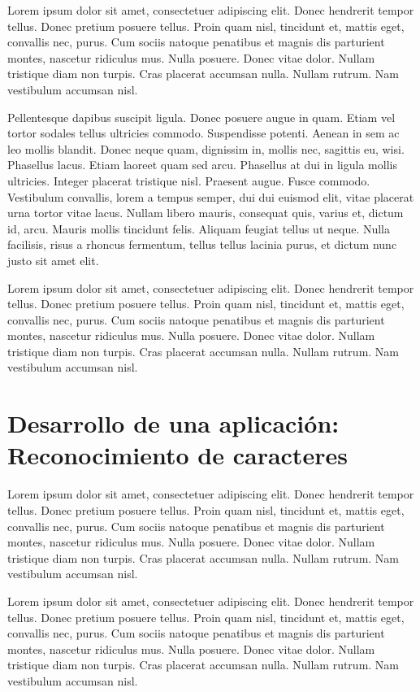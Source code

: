 Lorem ipsum dolor sit amet, consectetuer adipiscing elit.  Donec
hendrerit tempor tellus.  Donec pretium posuere tellus.  Proin quam
nisl, tincidunt et, mattis eget, convallis nec, purus.  Cum sociis
natoque penatibus et magnis dis parturient montes, nascetur ridiculus
mus.  Nulla posuere.  Donec vitae dolor.  Nullam tristique diam non
turpis.  Cras placerat accumsan nulla.  Nullam rutrum.  Nam vestibulum
accumsan nisl.

Pellentesque dapibus suscipit ligula.  Donec posuere augue in quam.
Etiam vel tortor sodales tellus ultricies commodo.  Suspendisse
potenti.  Aenean in sem ac leo mollis blandit.  Donec neque quam,
dignissim in, mollis nec, sagittis eu, wisi.  Phasellus lacus.  Etiam
laoreet quam sed arcu.  Phasellus at dui in ligula mollis ultricies.
Integer placerat tristique nisl.  Praesent augue.  Fusce commodo.
Vestibulum convallis, lorem a tempus semper, dui dui euismod elit,
vitae placerat urna tortor vitae lacus.  Nullam libero mauris,
consequat quis, varius et, dictum id, arcu.  Mauris mollis tincidunt
felis.  Aliquam feugiat tellus ut neque.  Nulla facilisis, risus a
rhoncus fermentum, tellus tellus lacinia purus, et dictum nunc justo
sit amet elit.


Lorem ipsum dolor sit amet, consectetuer adipiscing elit.  Donec
hendrerit tempor tellus.  Donec pretium posuere tellus.  Proin quam
nisl, tincidunt et, mattis eget, convallis nec, purus.  Cum sociis
natoque penatibus et magnis dis parturient montes, nascetur ridiculus
mus.  Nulla posuere.  Donec vitae dolor.  Nullam tristique diam non
turpis.  Cras placerat accumsan nulla.  Nullam rutrum.  Nam vestibulum
accumsan nisl.

\section{Desarrollo de una aplicación: Reconocimiento de caracteres}

Lorem ipsum dolor sit amet, consectetuer adipiscing elit.  Donec
hendrerit tempor tellus.  Donec pretium posuere tellus.  Proin quam
nisl, tincidunt et, mattis eget, convallis nec, purus.  Cum sociis
natoque penatibus et magnis dis parturient montes, nascetur ridiculus
mus.  Nulla posuere.  Donec vitae dolor.  Nullam tristique diam non
turpis.  Cras placerat accumsan nulla.  Nullam rutrum.  Nam vestibulum
accumsan nisl.

Lorem ipsum dolor sit amet, consectetuer adipiscing elit.  Donec
hendrerit tempor tellus.  Donec pretium posuere tellus.  Proin quam
nisl, tincidunt et, mattis eget, convallis nec, purus.  Cum sociis
natoque penatibus et magnis dis parturient montes, nascetur ridiculus
mus.  Nulla posuere.  Donec vitae dolor.  Nullam tristique diam non
turpis.  Cras placerat accumsan nulla.  Nullam rutrum.  Nam vestibulum
accumsan nisl.

